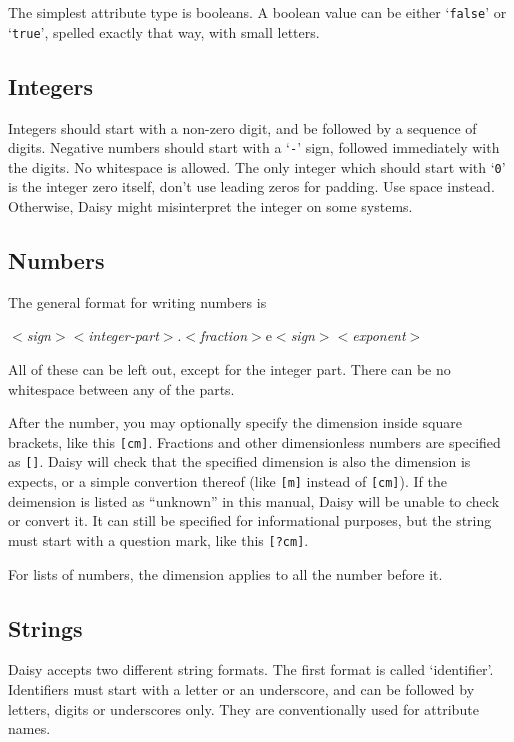The simplest attribute type is booleans.  A boolean value can be
either `\texttt{false}' or `\texttt{true}', spelled exactly that way,
with small letters.

\subsection{Integers}
\label{type:integer}

Integers should start with a non-zero digit, and be followed by a
sequence of digits.  Negative numbers should start with a `\texttt{-}'
sign, followed immediately with the digits.  No whitespace is allowed.
The only integer which should start with `\texttt{0}' is the integer
zero itself, don't use leading zeros for padding.  Use space instead.
Otherwise, Daisy might misinterpret the integer on some systems.

\subsection{Numbers}
\label{type:number}

The general format for writing numbers is

\begin{tt}
  $<$\emph{sign}$>$$<$\emph{integer-part}$>$.$<$\emph{fraction}$>$e$<$\emph{sign}$>$$<$\emph{exponent}$>$
\end{tt}

All of these can be left out, except for the integer part.  There can
be no whitespace between any of the parts.

After the number, you may optionally specify the dimension inside
square brackets, like this \verb|[cm]|.  Fractions and other
dimensionless numbers are specified as \verb|[]|.  Daisy will check
that the specified dimension is also the dimension is expects, or a
simple convertion thereof (like \verb|[m]| instead of \verb|[cm]|).
If the deimension is listed as ``unknown'' in this manual, Daisy will
be unable to check or convert it.  It can still be specified for
informational purposes, but the string must start with a question
mark, like this \verb|[?cm]|.

For lists of numbers, the dimension applies to all the number before
it. 

\subsection{Strings}
\label{type:string}

Daisy accepts two different string formats.  The first format is called
`identifier'.  Identifiers must start with a letter or an underscore,
and can be followed by letters, digits or underscores only.  They are
conventionally used for attribute names.

